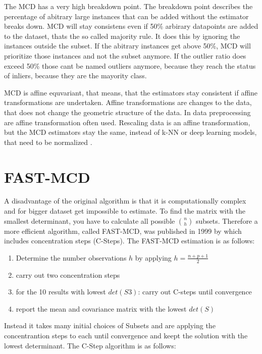 

The MCD has a very high breakdown point.
The breakdown point describes the percentage of abitrary large instances that can be added without the estimator breaks down.
MCD will stay consistens even if 50\% arbirary datapoints are added to the dataset, thats the so called majority rule.
It does this by ignoring the instances outside the subset.
If the abitrary instances get above 50\%, MCD will prioritize those instances and not the subset anymore.
If the outlier ratio does exceed 50\% those cant be named outliers anymore, because they reach the status of inliers, because they are the mayority class. 


MCD is affine equvariant, that means, that the estimators stay consistent if affine transformations are undertaken.
Affine transformations are changes to the data, that does not change the geometric structure of the data.
In data preprocessing are affine transformation often used.
Rescaling data is an affine transformation, but the MCD estimators stay the same, instead of k-NN or deep learning models, that need to be normalized \citet{hubert2018minimum}.
  


\section*{FAST-MCD}
A disadvantage of the original algorithm is that it is computationally complex and for bigger dataset get impossible to estimate.
To find the matrix with the smallest determinant, you have to calculate all possible $\binom{n}{h}$ subsets.  
Therefore a more efficient algorithm, called FAST-MCD, was published in 1999 by \citet{rousseeuw1999fast} which includes concentration steps (C-Steps).
The FAST-MCD estimation is as follows:  

\begin{enumerate}
    \item Determine the number observations $h$ by applying $h = \frac{n+p+1}{2}$
    \item carry out two concentration steps
    \item for the 10 results with lowest $det(S3)$: carry out C-steps until convergence
    \item report the mean and covariance matrix with the lowest $det(S)$
\end{enumerate}
 
Instead it takes many initial choices of Subsets and are applying the concentrantion steps to each until convergence and keept the solution with the lowest determinant.
The C-Step algorithm is as follows:

